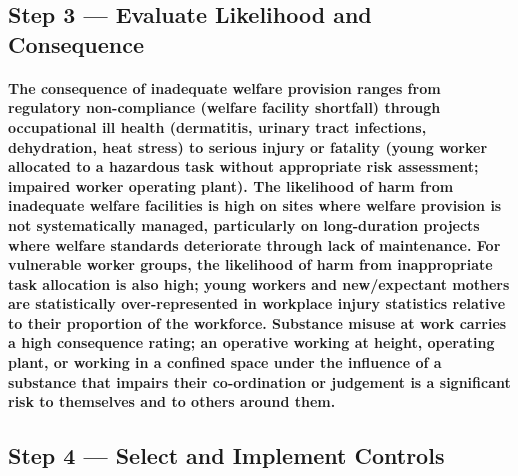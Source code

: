 \subsection{Step 3 --- Evaluate Likelihood and Consequence}
\paragraph{The consequence of inadequate welfare provision ranges from regulatory non-compliance (welfare facility shortfall) through occupational ill health (dermatitis, urinary tract infections, dehydration, heat stress) to serious injury or fatality (young worker allocated to a hazardous task without appropriate risk assessment; impaired worker operating plant). The likelihood of harm from inadequate welfare facilities is high on sites where welfare provision is not systematically managed, particularly on long-duration projects where welfare standards deteriorate through lack of maintenance. For vulnerable worker groups, the likelihood of harm from inappropriate task allocation is also high; young workers and new/expectant mothers are statistically over-represented in workplace injury statistics relative to their proportion of the workforce. Substance misuse at work carries a high consequence rating; an operative working at height, operating plant, or working in a confined space under the influence of a substance that impairs their co-ordination or judgement is a significant risk to themselves and to others around them.}

\subsection{Step 4 --- Select and Implement Controls}
